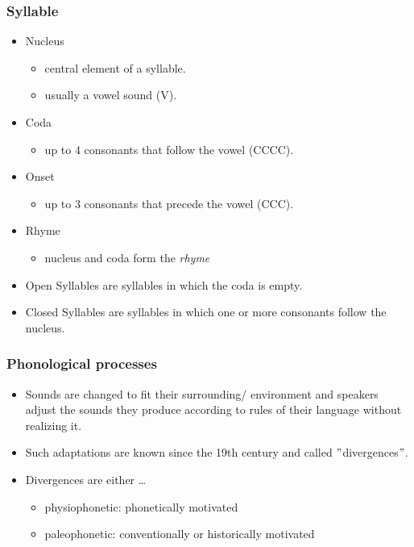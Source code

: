 \documentclass[12pt, table]{beamer}
\begin{document}
\begin{frame}
\frametitle{Syllable}
\begin{itemize}
\item Nucleus
\begin{itemize}
\item central element of a syllable.
\item usually a vowel sound (V).
\end{itemize}
\item Coda
\begin{itemize}
\item up to 4 consonants that follow the vowel (CCCC).
\end{itemize}
\item Onset
\begin{itemize}
\item up to 3 consonants that precede the vowel (CCC).
\end{itemize}
\item Rhyme
\begin{itemize}
\item nucleus and coda form the \textit{rhyme}
\end{itemize}
\item Open Syllables are syllables in which the coda is empty.
\item Closed Syllables are syllables in which one or more consonants follow the nucleus.
\end{itemize}
\end{frame}

\begin{frame}
\frametitle{Phonological processes}
\begin{itemize}
\item Sounds are changed to fit their surrounding/ environment and speakers adjust the sounds they produce according to rules of their language without realizing it.
\item Such adaptations are known since the 19th century and called $"$divergences$"$.
\item Divergences are either \dots
\begin{itemize}
\item physiophonetic: phonetically motivated
\item paleophonetic: conventionally or historically motivated
\end{itemize} 
\end{itemize}
\end{frame}
\end{document}
